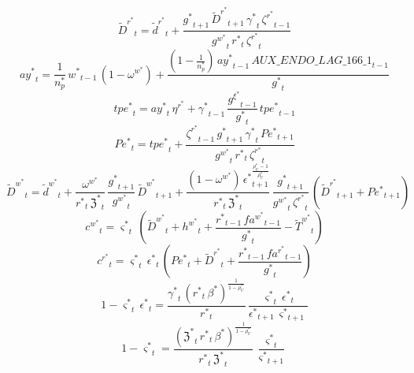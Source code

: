 \begin{dmath}
{\tilde{D}^r^*}_{t}={\tilde{d}^r^*}_{t}+\frac{{{g^*}}_{t+1}\, {\tilde{D}^r^*}_{t+1}\, {{\gamma^*}}_{t}\, {{\zeta^r^*}}_{t-1}}{{{g^w^*}}_{t}\, {{r^*}}_{t}\, {{\zeta^r^*}}_{t}}
\end{dmath}
\begin{dmath}
{{ay^*}}_{t}=\frac{1}{{{n_p^*}}}\, {{w^*}}_{t-1}\, \left(1-{{\omega^w^*}}\right)+\frac{\left(1-\frac{1}{{{n_p^*}}}\right)\, {{ay^*}}_{t-1}\, {AUX\_ENDO\_LAG\_166\_1}_{t-1}}{{{g^*}}_{t}}
\end{dmath}
\begin{dmath}
{{tpe^*}}_{t}={{ay^*}}_{t}\, {{\eta^r^*}}+{{\gamma^*}}_{t-1}\, \frac{{{g^{\xi}^*}}_{t-1}}{{{g^*}}_{t}}\, {{tpe^*}}_{t-1}
\end{dmath}
\begin{dmath}
{{Pe^*}}_{t}={{tpe^*}}_{t}+\frac{{{\zeta^r^*}}_{t-1}\, {{g^*}}_{t+1}\, {{\gamma^*}}_{t}\, {{Pe^*}}_{t+1}}{{{g^w^*}}_{t}\, {{r^*}}_{t}\, {{\zeta^r^*}}_{t}}
\end{dmath}
\begin{dmath}
{\tilde{D}^w^*}_{t}={\tilde{d}^w^*}_{t}+\frac{{{\omega^w^*}}}{{{r^*}}_{t}\, {{\mathfrak{Z}^*}}_{t}}\, \frac{{{g^*}}_{t+1}}{{{g^w^*}}_{t}}\, {\tilde{D}^w^*}_{t+1}+\frac{\left(1-{{\omega^w^*}}\right)\, {{\epsilon^*}}_{t+1}^{\frac{{{\rho_U^*}}-1}{{{\rho_U^*}}}}}{{{r^*}}_{t}\, {{\mathfrak{Z}^*}}_{t}}\, \frac{{{g^*}}_{t+1}}{{{g^w^*}}_{t}\, {{\zeta^r^*}}_{t}}\, \left({\tilde{D}^r^*}_{t+1}+{{Pe^*}}_{t+1}\right)
\end{dmath}
\begin{dmath}
{{c^w^*}}_{t}={{\varsigma^*}}_{t}\, \left({\tilde{D}^w^*}_{t}+{{h^w^*}}_{t}+\frac{{{r^*}}_{t-1}\, {{fa^w^*}}_{t-1}}{{{g^*}}_{t}}-{\tilde{T}^w^*}_{t}\right)
\end{dmath}
\begin{dmath}
{{c^r^*}}_{t}={{\varsigma^*}}_{t}\, {{\epsilon^*}}_{t}\, \left({{Pe^*}}_{t}+{\tilde{D}^r^*}_{t}+\frac{{{r^*}}_{t-1}\, {{fa^r^*}}_{t-1}}{{{g^*}}_{t}}\right)
\end{dmath}
\begin{dmath}
1-{{\varsigma^*}}_{t}\, {{\epsilon^*}}_{t}=\frac{{{\gamma^*}}_{t}\, \left({{r^*}}_{t}\, {{\beta^*}}\right)^{\frac{1}{1-{{\rho_U^*}}}}}{{{r^*}}_{t}}\, \frac{{{\varsigma^*}}_{t}\, {{\epsilon^*}}_{t}}{{{\epsilon^*}}_{t+1}\, {{\varsigma^*}}_{t+1}}
\end{dmath}
\begin{dmath}
1-{{\varsigma^*}}_{t}=\frac{\left({{\mathfrak{Z}^*}}_{t}\, {{r^*}}_{t}\, {{\beta^*}}\right)^{\frac{1}{1-{{\rho_U^*}}}}}{{{r^*}}_{t}\, {{\mathfrak{Z}^*}}_{t}}\, \frac{{{\varsigma^*}}_{t}}{{{\varsigma^*}}_{t+1}}
\end{dmath}
